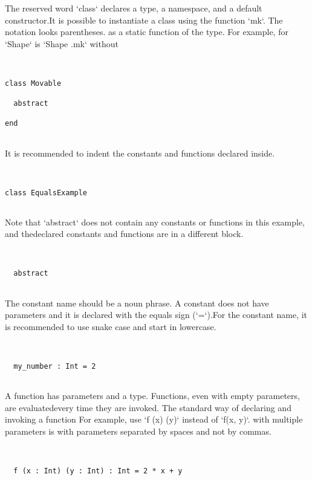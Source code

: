 \documentclass[12pt,a4paper]{article}
\begin{document}
The reserved word `class` declares a type, a namespace, and a default constructor.It is possible to instantiate a class using the function `mk`. The notation looks
parentheses. as a static function of the type. For example, for `Shape` is `Shape .mk` without


\begin{lstlisting}


class Movable

  abstract

end


\end{lstlisting}

It is recommended to indent the constants and functions declared inside. 


\begin{lstlisting}


class EqualsExample


\end{lstlisting}

Note that `abstract` does not contain any constants or functions in this example, and thedeclared constants and functions are in a different block. 


\begin{lstlisting}


  abstract


\end{lstlisting}

The constant name should be a noun phrase. A constant does not have parameters and it is declared with the equals sign (`=`).For the constant name, it is recommended to use snake case and start in lowercase.


\begin{lstlisting}


  my_number : Int = 2


\end{lstlisting}

A function has parameters and a type. Functions, even with empty parameters, are evaluatedevery time they are invoked. The standard way of declaring and invoking a function
For example, use `f (x) (y)` instead of `f(x, y)`. with multiple parameters is with parameters separated by spaces and not by commas.


\begin{lstlisting}


  f (x : Int) (y : Int) : Int = 2 * x + y


\end{lstlisting}
\end{document}
